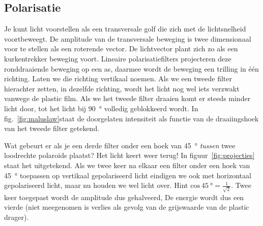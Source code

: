\documentclass[../../main.tex]{subfiles}
\begin{document}
\subsection*{Polarisatie}
Je kunt licht voorstellen als een transversale golf die zich met de lichtsnelheid voortbeweegt. De amplitude van de transversale beweging is twee dimensionaal voor te stellen als een roterende vector. De lichtvector plant zich zo als een kurkentrekker beweging voort. Lineaire polarisatiefilters projecteren deze ronddraaiende beweging op een as, daarmee wordt de beweging een trilling in \'e\'en richting. Laten we die richting vertikaal noemen.
Als we een tweede filter hierachter zetten, in dezelfde richting, wordt het licht nog wel iets verzwakt vanwege de plastic film. Als we het tweede filter draaien komt er steeds minder licht door, tot het licht bij \SI{90}{\degree} volledig geblokkeerd wordt. In fig.~\ref{fig:maluslaw}staat de doorgelaten intensiteit als functie van de draaiingshoek van het tweede filter getekend.

Wat gebeurt er als je een derde filter onder een hoek van \SI{45}{\degree} \textit{tussen} twee loodrechte polaroids plaatst? Het licht keert weer terug!
In figuur~\ref{fig:projecties} staat het uitgetekend. Als we twee keer na elkaar een filter onder een hoek van \SI{45}{\degree} toepassen op vertikaal gepolariseerd licht eindigen we ook met horizontaal gepolariseerd licht, maar nu houden we wel licht over.
Hint $\mathrm{cos~\SI{45}{\degree}  =\tfrac{1}{\sqrt{2}}}$.
Twee keer toegepast wordt de amplitude dus gehalveerd, De energie wordt dus een vierde (niet meegenomen is verlies als gevolg van  de grijswaarde van de plastic drager).
\end{document}
